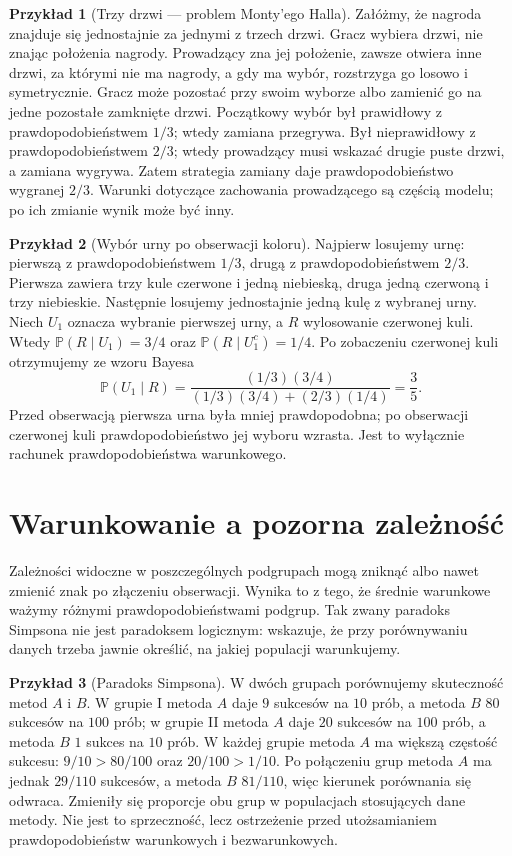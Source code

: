\documentclass[11pt,a4paper,oneside]{report}
\numberwithin{equation}{chapter}
\theoremstyle{plain}
\theoremstyle{definition}
\newtheorem{przyklad}{Przykład}[chapter]
\theoremstyle{remark}
\newcommand{\Prob}{\mathbb{P}}
\begin{document}
\begin{przyklad}[Trzy drzwi --- problem Monty'ego Halla]
Załóżmy, że nagroda znajduje się jednostajnie za jednymi z trzech drzwi.
Gracz wybiera drzwi, nie znając położenia nagrody. Prowadzący zna jej
położenie, zawsze otwiera inne drzwi, za którymi nie ma nagrody,
a gdy ma wybór, rozstrzyga go losowo i symetrycznie. Gracz może
pozostać przy swoim wyborze albo zamienić go na jedne pozostałe
zamknięte drzwi. Początkowy wybór był prawidłowy z prawdopodobieństwem
$1/3$; wtedy zamiana przegrywa. Był nieprawidłowy z prawdopodobieństwem
$2/3$; wtedy prowadzący musi wskazać drugie puste drzwi, a zamiana
wygrywa. Zatem strategia zamiany daje prawdopodobieństwo wygranej $2/3$.
Warunki dotyczące zachowania prowadzącego są częścią modelu;
po ich zmianie wynik może być inny.
\end{przyklad}

\begin{przyklad}[Wybór urny po obserwacji koloru]
Najpierw losujemy urnę: pierwszą z prawdopodobieństwem $1/3$,
drugą z prawdopodobieństwem $2/3$. Pierwsza zawiera trzy kule
czerwone i jedną niebieską, druga jedną czerwoną i trzy niebieskie.
Następnie losujemy jednostajnie jedną kulę z wybranej urny.
Niech $U_1$ oznacza wybranie pierwszej urny, a $R$ wylosowanie
czerwonej kuli. Wtedy $\Prob(R\mid U_1)=3/4$ oraz
$\Prob(R\mid U_1^c)=1/4$. Po zobaczeniu czerwonej kuli
otrzymujemy ze wzoru Bayesa
\[
\Prob(U_1\mid R)
=\frac{(1/3)(3/4)}{(1/3)(3/4)+(2/3)(1/4)}
=\frac35.
\]
Przed obserwacją pierwsza urna była mniej prawdopodobna;
po obserwacji czerwonej kuli prawdopodobieństwo jej wyboru wzrasta.
Jest to wyłącznie rachunek prawdopodobieństwa warunkowego.
\end{przyklad}

\section{Warunkowanie a pozorna zależność}
Zależności widoczne w poszczególnych podgrupach mogą zniknąć
albo nawet zmienić znak po złączeniu obserwacji. Wynika to z tego,
że średnie warunkowe ważymy różnymi prawdopodobieństwami podgrup.
Tak zwany paradoks Simpsona nie jest paradoksem logicznym:
wskazuje, że przy porównywaniu danych trzeba jawnie określić,
na jakiej populacji warunkujemy.

\begin{przyklad}[Paradoks Simpsona]
W dwóch grupach porównujemy skuteczność metod $A$ i $B$.
W grupie I metoda $A$ daje $9$ sukcesów na $10$ prób, a metoda $B$
$80$ sukcesów na $100$ prób; w grupie II metoda $A$ daje
$20$ sukcesów na $100$ prób, a metoda $B$ $1$ sukces na $10$ prób.
W każdej grupie metoda $A$ ma większą częstość sukcesu:
$9/10>80/100$ oraz $20/100>1/10$.
Po połączeniu grup metoda $A$ ma jednak $29/110$ sukcesów,
a metoda $B$ $81/110$, więc kierunek porównania się odwraca.
Zmieniły się proporcje obu grup w populacjach stosujących dane metody.
Nie jest to sprzeczność, lecz ostrzeżenie przed utożsamianiem
prawdopodobieństw warunkowych i bezwarunkowych.
\end{przyklad}
\end{document}
